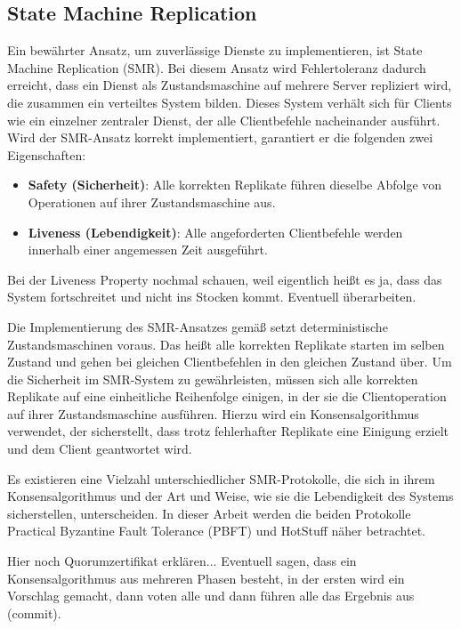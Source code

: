\documentclass[nonacm,sigconf,natbib=false]{acmart}
\begin{document}
\subsection{State Machine Replication}

Ein bewährter Ansatz, um zuverlässige Dienste zu implementieren, ist State Machine Replication (SMR)\cite{smr-lamport}\cite{smr-schneider}. Bei diesem Ansatz wird Fehlertoleranz dadurch erreicht, dass ein Dienst als Zustandsmaschine auf mehrere Server repliziert wird, die zusammen ein verteiltes System bilden. Dieses System verhält sich für Clients wie ein einzelner zentraler Dienst, der alle Clientbefehle nacheinander ausführt. Wird der SMR-Ansatz korrekt implementiert, garantiert er die folgenden zwei Eigenschaften:
\begin{itemize}
  \item \textbf{Safety (Sicherheit)}: Alle korrekten Replikate führen dieselbe Abfolge von Operationen auf ihrer Zustandsmaschine aus.
  \item \textbf{Liveness (Lebendigkeit)}: Alle angeforderten Clientbefehle werden innerhalb einer angemessen Zeit ausgeführt.
\end{itemize}

Bei der Liveness Property nochmal schauen, weil eigentlich heißt es ja, dass das System fortschreitet und nicht ins Stocken kommt. Eventuell überarbeiten.

Die Implementierung des SMR-Ansatzes gemäß \cite{smr-schneider} setzt deterministische Zustandsmaschinen voraus. Das heißt alle korrekten Replikate starten im selben Zustand und gehen bei gleichen Clientbefehlen in den gleichen Zustand über. Um die Sicherheit im SMR-System zu gewährleisten, müssen sich alle korrekten Replikate auf eine einheitliche Reihenfolge einigen, in der sie die Clientoperation auf ihrer Zustandsmaschine ausführen. Hierzu wird ein Konsensalgorithmus verwendet, der sicherstellt, dass trotz fehlerhafter Replikate eine Einigung erzielt und dem Client geantwortet wird.

Es existieren eine Vielzahl unterschiedlicher SMR-Protokolle, die sich in ihrem Konsensalgorithmus und der Art und Weise, wie sie die Lebendigkeit des Systems sicherstellen, unterscheiden. In dieser Arbeit werden die beiden Protokolle Practical Byzantine Fault Tolerance (PBFT)\cite{pbft} und HotStuff\cite{hotstuff} näher betrachtet.

Hier noch Quorumzertifikat erklären...
Eventuell sagen, dass ein Konsensalgorithmus aus mehreren Phasen besteht, in der ersten wird ein Vorschlag gemacht, dann voten alle und dann führen alle das Ergebnis aus (commit).
\end{document}
